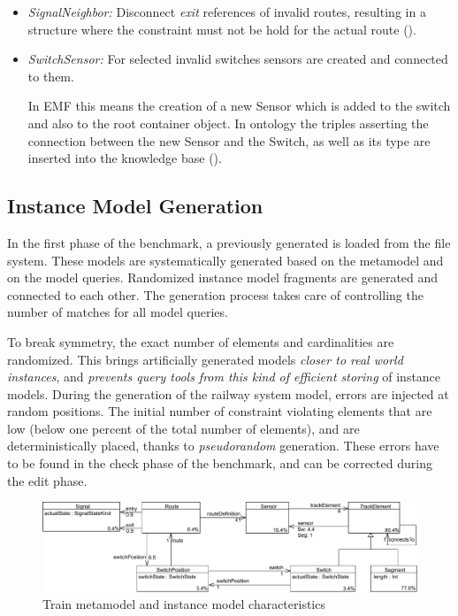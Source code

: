 \begin{itemize}
\begin{itemize}
    \item  \emph{SignalNeighbor:} Disconnect \emph{exit} references of invalid routes, resulting in a structure where the constraint must not be hold for the actual route ().
        
    \item \emph{SwitchSensor:} For selected invalid switches sensors are created and connected to them.
    
    In EMF this means the creation of a new Sensor which is added to the switch and also to the root container object. In ontology the triples asserting the connection between the new Sensor and the Switch, as well as its type are inserted into the knowledge base ().
    
  \end{itemize}
\end{itemize}
 


\subsection{Instance Model Generation}
\label{sec:instanceGeneration}

In the first phase of the benchmark, a previously generated  is loaded from the file system. These models are systematically generated based on the metamodel and on the model queries. Randomized instance model fragments are generated and connected to each other. The generation process takes care of controlling the number of matches for all model queries.

To break symmetry, the exact number of elements and cardinalities are randomized. This brings artificially generated models \emph{closer to real world instances}, and \emph{prevents query tools from this kind of efficient storing} of instance models. During the generation of the railway system model, errors are injected at random positions. The initial number of constraint violating elements that are low (below one percent of the total number of elements), and are deterministically placed, thanks to \emph{pseudorandom} generation. These errors have to be found in the check phase of the benchmark, and can be corrected during the edit phase.

\begin{figure}[Htb]
\begin{center}
\includegraphics[width=\textwidth]{figures/instance/TrainMMb.pdf}
\caption{Train metamodel and instance model characteristics}
\label{fig:metamodel-instance-characteristics}
\end{center}
\end{figure}

